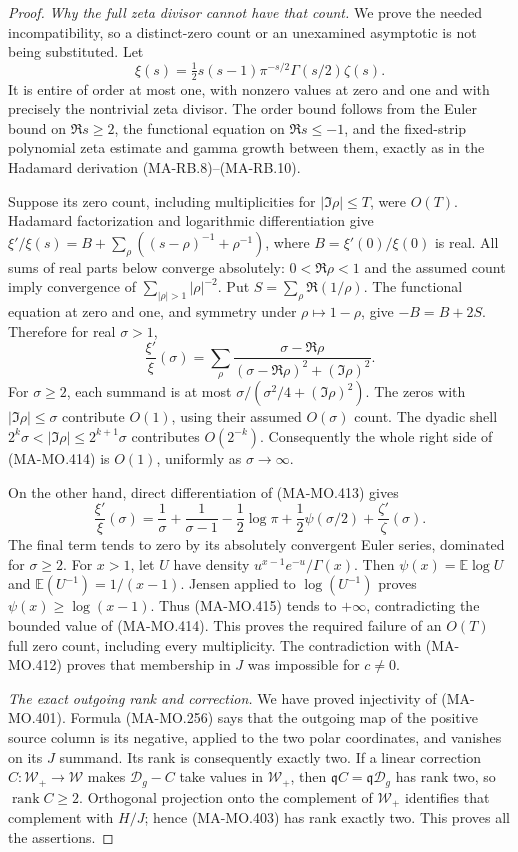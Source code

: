 \begin{proof}
\emph{Why the full zeta divisor cannot have that count.}
We prove the needed incompatibility, so a distinct-zero
count or an unexamined asymptotic is not being substituted.
Let
\[
       \xi(s)=\tfrac12s(s-1)\pi^{-s/2}\Gamma(s/2)\zeta(s).
 \tag{MA-MO.413}
\]
It is entire of order at most one, with nonzero values
at zero and one and with precisely the nontrivial zeta
divisor. The order bound follows from the Euler bound on
\(\Re s\ge2\), the functional equation on
\(\Re s\le-1\), and the fixed-strip polynomial zeta
estimate and gamma growth between them, exactly as in the
Hadamard derivation (MA-RB.8)--(MA-RB.10).

Suppose its zero count, including multiplicities for
\(|\Im\rho|\le T\), were \(O(T)\). Hadamard
factorization and logarithmic differentiation give
\(\xi'/\xi(s)=B+\sum_\rho((s-\rho)^{-1}+\rho^{-1})\),
where \(B=\xi'(0)/\xi(0)\) is real. All sums of real
parts below converge absolutely: \(0<\Re\rho<1\)
and the assumed count imply convergence of
\(\sum_{|\rho|>1}|\rho|^{-2}\).
Put \(S=\sum_\rho\Re(1/\rho)\). The functional equation
at zero and one, and symmetry under \(\rho\mapsto1-\rho\),
give \(-B=B+2S\). Therefore for real \(\sigma>1\),
\[
       \frac{\xi'}{\xi}(\sigma)
          =\sum_\rho\frac{\sigma-\Re\rho}
                    {(\sigma-\Re\rho)^2+(\Im\rho)^2}.
 \tag{MA-MO.414}
\]
For \(\sigma\ge2\), each summand is at most
\(\sigma/(\sigma^2/4+(\Im\rho)^2)\). The zeros with
\(|\Im\rho|\le\sigma\) contribute \(O(1)\), using
their assumed \(O(\sigma)\) count. The dyadic shell
\(2^k\sigma<|\Im\rho|\le2^{k+1}\sigma\) contributes
\(O(2^{-k})\). Consequently the whole right side of
(MA-MO.414) is \(O(1)\), uniformly as \(\sigma\to\infty\).

On the other hand, direct differentiation of (MA-MO.413)
gives
\[
 \frac{\xi'}{\xi}(\sigma)
   =\frac1\sigma+\frac1{\sigma-1}-\frac12\log\pi
       +\frac12\psi(\sigma/2)
       +\frac{\zeta'}{\zeta}(\sigma).
 \tag{MA-MO.415}
\]
The final term tends to zero by its absolutely convergent
Euler series, dominated for \(\sigma\ge2\). For \(x>1\),
let \(U\) have density \(u^{x-1}e^{-u}/\Gamma(x)\).
Then \(\psi(x)=\mathbb E\log U\) and
\(\mathbb E(U^{-1})=1/(x-1)\). Jensen applied to
\(\log(U^{-1})\) proves
\(\psi(x)\ge\log(x-1)\). Thus (MA-MO.415) tends to
\(+\infty\), contradicting the bounded value of
(MA-MO.414). This proves the required failure of an
\(O(T)\) full zero count, including every multiplicity.
The contradiction with (MA-MO.412) proves that membership
in \(J\) was impossible for \(c\ne0\).

\emph{The exact outgoing rank and correction.}
We have proved injectivity of (MA-MO.401). Formula
(MA-MO.256) says that the outgoing map of the positive
source column is its negative, applied to the two polar
coordinates, and vanishes on its \(J\) summand. Its
rank is consequently exactly two. If a linear correction
\(C:\mathcal W_+\to\mathcal W\) makes
\(\mathscr D_g-C\) take values in \(\mathcal W_+\),
then \(\mathfrak qC=\mathfrak q\mathscr D_g\) has rank
two, so \(\operatorname{rank}C\ge2\). Orthogonal
projection onto the complement of \(\mathcal W_+\)
identifies that complement with \(H/J\); hence (MA-MO.403)
has rank exactly two. This proves all the assertions.
\end{proof}


